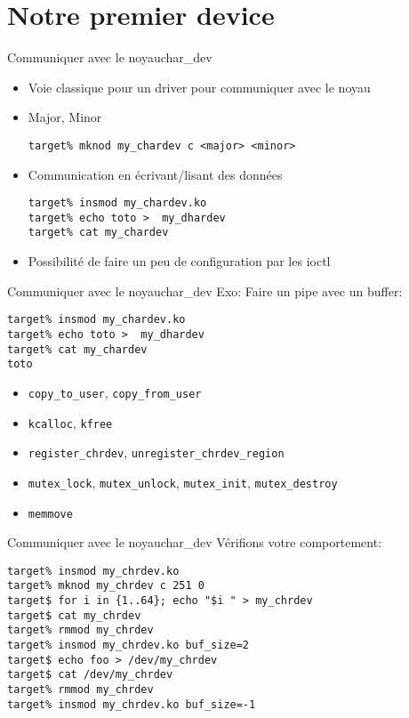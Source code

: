 \section{Notre premier device}

\begin{frame}[fragile=singleslide]{Communiquer avec le noyau}{char\_dev}
  \begin{itemize}
  \item Voie classique pour un driver pour communiquer avec le noyau
  \item Major, Minor
    \begin{lstlisting}
target% mknod my_chardev c <major> <minor>
    \end{lstlisting}
  \item Communication en écrivant/lisant des données
    \begin{lstlisting}
target% insmod my_chardev.ko
target% echo toto >  my_dhardev
target% cat my_chardev
    \end{lstlisting}
  \item Possibilité de faire un peu de configuration par les ioctl
  \end{itemize}
\end{frame}

\begin{frame}[fragile=singleslide]{Communiquer avec le noyau}{char\_dev}
  Exo: Faire un pipe avec un buffer:
  \begin{lstlisting}
target% insmod my_chardev.ko
target% echo toto >  my_dhardev
target% cat my_chardev
toto
  \end{lstlisting}
  \begin{itemize}
  \item \verb+copy_to_user+, \verb+copy_from_user+
  \item \verb+kcalloc+, \verb+kfree+
  \item \verb+register_chrdev+, \verb+unregister_chrdev_region+
  \item   \verb+mutex_lock+,  \verb+mutex_unlock+,  \verb+mutex_init+,
    \verb+mutex_destroy+
  \item \verb+memmove+
  \end{itemize}
\end{frame}

\begin{frame}[fragile=singleslide]{Communiquer avec le noyau}{char\_dev}
   Vérifions votre comportement:
   \begin{lstlisting}
target% insmod my_chrdev.ko
target% mknod my_chrdev c 251 0
target$ for i in {1..64}; echo "$i " > my_chrdev
target$ cat my_chrdev
target% rmmod my_chrdev
target% insmod my_chrdev.ko buf_size=2
target$ echo foo > /dev/my_chrdev
target$ cat /dev/my_chrdev
target% rmmod my_chrdev
target% insmod my_chrdev.ko buf_size=-1
    \end{lstlisting} %
\end{frame}
 
